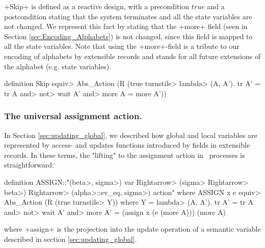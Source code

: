 \documentclass[11pt,a4paper]{article}
\begin{document}
\inlineisar+Skip+ is defined as a reactive design, with a precondition $true$ and
a postcondition stating that the system terminates and all the state variables are not changed. 
We represent this fact by stating that the \inlineisar+more+ field (seen in  Section \ref{sec:Encoding_Alphabets}) 
is not changed, since this field is mapped to all the state variables. Note
that using the \inlineisar+more+-field is a tribute to our encoding of alphabets by extensible records
and stands for all future extensions of the alphabet (e.g. state variables).

\begin{isar}
definition Skip \<equiv>    Abs_Action (R (true \<turnstile>   \<lambda> (A, A'). tr A' = tr A 
                                       \<and> \<not> wait A' \<and>  more A = more A'))
\end{isar}


\subsubsection{The universal assignment action.}\label{sec:assignment_action}
In Section \ref{sec:updating_global}, we described how global and local variables are represented
by access- and updates functions introduced by fields in extensible records. In these terms, the
 "lifting" to the assignment action in \Circus\ processes is straightforward:
\begin{isar}
definition
  ASSIGN::"(\<beta>, \<sigma>) var \<Rightarrow> (\<sigma> \<Rightarrow> \<beta>) \<Rightarrow> (\<alpha>::ev_eq, \<sigma>) action"
where
  ASSIGN x e \<equiv>   Abs_Action (R (true \<turnstile>   Y))
where
 Y = \<lambda> (A, A'). tr A' = tr A \<and>    \<not> wait A' \<and> 
                  more A' = (assign x (e (more A))) (more A)
\end{isar}
where \inlineisar+assign+ is the projection into the update operation of a semantic variable 
described in section \ref{sec:updating_global}.
\end{document}

